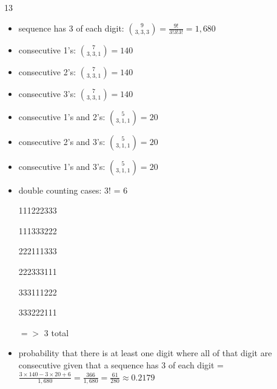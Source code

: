 \documentclass[12 pt]{article}
\begin{document}
    \begin{exercise}{13}
    \hfill

    \begin{itemize}
        \item sequence has 3 of each digit: $\binom{9}{3, 3, 3} = \frac{9!}{3!3!3!} = 1,680$

        \item consecutive 1's: $\binom{7}{3, 3, 1} = 140$
        \item consecutive 2's: $\binom{7}{3, 3, 1} = 140$
        \item consecutive 3's: $\binom{7}{3, 3, 1} = 140$

        \item consecutive 1's and 2's: $\binom{5}{3, 1, 1} = 20$
        \item consecutive 2's and 3's: $\binom{5}{3, 1, 1} = 20$ 
        \item consecutive 1's and 3's: $\binom{5}{3, 1, 1} = 20$

        \item double counting cases: 3! = 6

        111222333

        111333222

        222111333

        222333111

        333111222

        333222111

        $=>$ 3 total

        \item probability that there is at least one digit where all of that digit are consecutive given that a sequence has 3 of each digit = $\frac{3 \times 140 - 3 \times 20 + 6}{1,680} = \frac{366}{1,680} = \frac{61}{280} \approx 0.2179$
    \end{itemize}
        
    \end{exercise}
 
\end{document}
